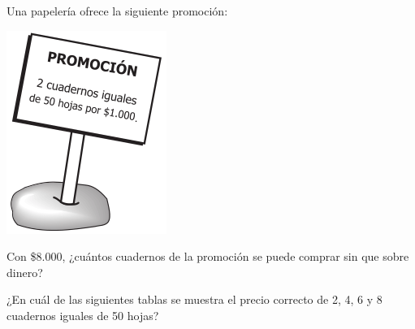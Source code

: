 \documentclass[10pt,addpoints]{exam}
\begin{document}
\begin{multicols}{2}
\begin{questions}
Una papelería ofrece la siguiente promoción:
\begin{center}
\includegraphics[scale=.5]{Images/Pantallazo-17.png} 
\end{center}
\question \label{q01}
Con \$8.000, ¿cuántos cuadernos de la promoción se puede comprar sin que sobre dinero?

\begin{oneparchoices}
\end{oneparchoices}
\question \label{q02}
¿En cuál de las siguientes tablas se muestra el precio correcto de 2, 4, 6 y 8 cuadernos iguales de 50 hojas?


\end{questions}
\end{multicols}
\end{document}

